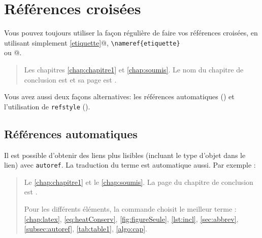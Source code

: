 

\clearpage



\section{Références croisées}
\label{sec:refs}

Vous pouvez toujours utiliser la façon régulière de faire vos références croisées, en utilisant simplement \verb@\ref{etiquette}@, \verb|\nameref{etiquette}| \\
ou \verb@\pageref{etiquette}@.

\begin{quote}
	Les chapitres \ref{chap:chapitre1} et \ref{chap:soumis}. Le nom du chapitre de conclusion est  et sa page est \pageref{chap:conclusion}. 
\end{quote}

Vous avez aussi deux façons alternatives: les références automatiques () et l'utilisation de \texttt{refstyle} ().

\subsection{Références automatiques}
\label{subsec:autoref}


Il est possible d'obtenir des liens plus lisibles (incluant le type d'objet dans le lien) avec \texttt{autoref}. La traduction du terme est automatique aussi.
Par exemple :

\begin{quote}
Le \autoref{chap:chapitre1} et le \autoref{chap:soumis}. La page du chapitre de conclusion est .

Pour les différents éléments, la commande choisit le meilleur terme : \autoref{chap:latex}, \autoref{eq:heatConserv}, \autoref{fig:figureSeule}, \autoref{lst:incl}, \autoref{sec:abbrev}, \autoref{subsec:autoref}, \autoref{tab:table1}, \autoref{algo:cap}.
\end{quote}

